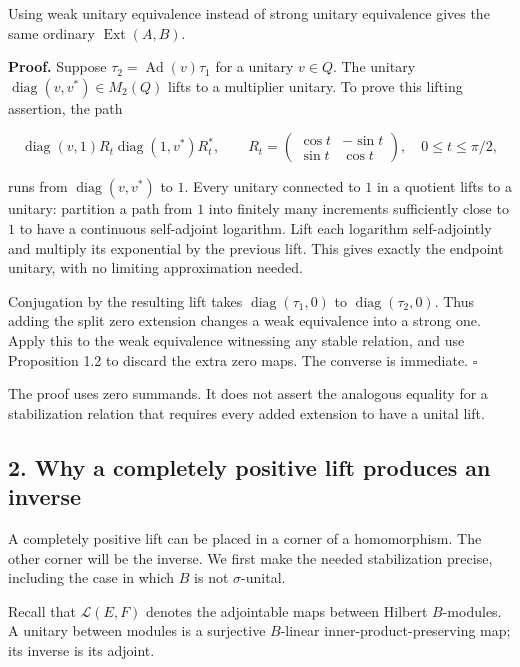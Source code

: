 \documentclass[
  11pt,
]{article}
\begin{document}
Using weak unitary equivalence instead of strong unitary equivalence
gives the same ordinary \(\operatorname{Ext}(A,B)\).

\textbf{Proof.} Suppose \(\tau_2=\operatorname{Ad}(v)\tau_1\) for a
unitary \(v\in Q\). The unitary \(\operatorname{diag}(v,v^*)\in M_2(Q)\)
lifts to a multiplier unitary. To prove this lifting assertion, the path

\[
\operatorname{diag}(v,1)R_t\operatorname{diag}(1,v^*)R_t^*,
\qquad
R_t=\begin{pmatrix}\cos t&-\sin t\\\sin t&\cos t\end{pmatrix},
\quad0\leq t\leq\pi/2,
\]

runs from \(\operatorname{diag}(v,v^*)\) to \(1\). Every unitary
connected to \(1\) in a quotient lifts to a unitary: partition a path
from \(1\) into finitely many increments sufficiently close to \(1\) to
have a continuous self-adjoint logarithm. Lift each logarithm
self-adjointly and multiply its exponential by the previous lift. This
gives exactly the endpoint unitary, with no limiting approximation
needed.

Conjugation by the resulting lift takes
\(\operatorname{diag}(\tau_1,0)\) to \(\operatorname{diag}(\tau_2,0)\).
Thus adding the split zero extension changes a weak equivalence into a
strong one. Apply this to the weak equivalence witnessing any stable
relation, and use Proposition 1.2 to discard the extra zero maps. The
converse is immediate. \(\square\)

The proof uses zero summands. It does not assert the analogous equality
for a stabilization relation that requires every added extension to have
a unital lift.

\subsection{2. Why a completely positive lift produces an
inverse}\label{why-a-completely-positive-lift-produces-an-inverse}

A completely positive lift can be placed in a corner of a homomorphism.
The other corner will be the inverse. We first make the needed
stabilization precise, including the case in which \(B\) is not
\(\sigma\)-unital.

Recall that \(\mathcal L(E,F)\) denotes the adjointable maps between
Hilbert \(B\)-modules. A unitary between modules is a surjective
\(B\)-linear inner-product-preserving map; its inverse is its adjoint.
\end{document}
